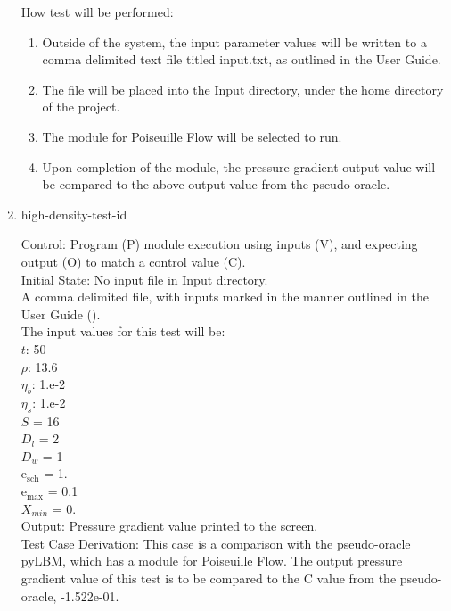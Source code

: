 \documentclass[12pt, titlepage]{article}
\newcounter{testcounter} %
\begin{document}
\begin{enumerate}
How test will be performed: 

\begin{enumerate}
\item Outside of the system, the input parameter values will be written to a
comma delimited text file titled input.txt, as outlined in the User Guide.
\item The file will be placed into the Input directory, under the home directory
of the project.
\item The module for Poiseuille Flow will be selected to run.
\item Upon completion of the module, the pressure gradient output value will be
compared to the above output value from the pseudo-oracle.
\end{enumerate}	

\item{high-density-test-id\thetestcounter \\}

Control: Program (P) module execution using inputs (V), and expecting output (O)
to match a control value (C).\\
					
Initial State: No input file in Input directory.\\
					
A comma delimited file, with inputs marked in the manner outlined in the User
Guide (\citet{LBM_UserGuide_PM}).\\The input values for this test will be:\\
$t$: 50\\
$\rho$: 13.6\\
$\eta_b$: 1.e-2\\
$\eta_s$: 1.e-2\\
$S$ = 16\\
$D_{l}$ = 2\\
$D_{w}$ = 1\\
$\mathrm{e_{sch}}$ = 1.\\
$\mathrm{e_{max}}$ = 0.1\\
$X_{min}$ = 0.\\

Output: Pressure gradient value printed to the screen.  \\

Test Case Derivation: This case is a comparison with the pseudo-oracle pyLBM,
which has a module for Poiseuille Flow. The output pressure gradient value of
this test is to be compared to the C value from the pseudo-oracle,
-1.522e-01.\\


\end{enumerate}
\end{document}
